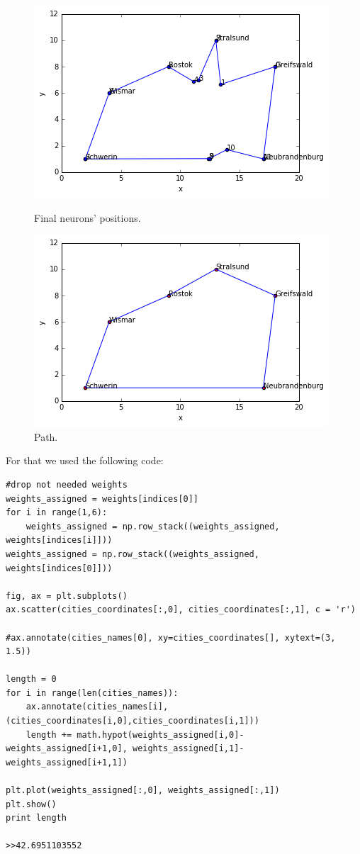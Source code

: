 \documentclass[a4paper, 12pt]{article}
\begin{document}
\begin{figure}[!htb]
  \includegraphics[width=\linewidth]{neuronsWithCities}
  \caption{Final neurons' positions.}\label{fig:neuronsWithCities}
\endminipage\hfill
{}
  \includegraphics[width=\linewidth]{path}
  \caption{Path.}\label{fig:path}
\endminipage\hfill
\end{figure}

For that we used the following code:

\lstset{language=Python}
\begin{lstlisting}[frame=single]
#drop not needed weights
weights_assigned = weights[indices[0]]
for i in range(1,6):
    weights_assigned = np.row_stack((weights_assigned, weights[indices[i]]))
weights_assigned = np.row_stack((weights_assigned, weights[indices[0]]))

fig, ax = plt.subplots()
ax.scatter(cities_coordinates[:,0], cities_coordinates[:,1], c = 'r')

#ax.annotate(cities_names[0], xy=cities_coordinates[], xytext=(3, 1.5))

length = 0
for i in range(len(cities_names)):
    ax.annotate(cities_names[i], (cities_coordinates[i,0],cities_coordinates[i,1]))
    length += math.hypot(weights_assigned[i,0]-weights_assigned[i+1,0], weights_assigned[i,1]-weights_assigned[i+1,1])
    
plt.plot(weights_assigned[:,0], weights_assigned[:,1])
plt.show()
print length

>>42.6951103552
\end{lstlisting}
\end{document}
